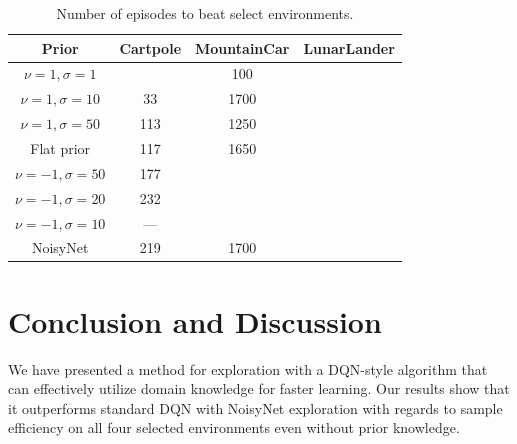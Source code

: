 \documentclass[]{uai2022} %
\begin{document}
\begin{table}
    \centering
    \caption{Number of episodes to beat select environments.}\label{tab:prior_results}
    \begin{tabular}{cccc}
        \toprule
        Prior & Cartpole & MountainCar & LunarLander\\
        \midrule
        \(\nu = 1, \sigma = 1\)   & \tB 14  & 100 &\\
        \(\nu = 1, \sigma = 10\)  &     33  & 1700 &\\
        \(\nu = 1, \sigma = 50\)  &     113 & 1250 &\\
        Flat prior                &     117 & 1650 &\\
        \(\nu = -1, \sigma = 50\) &     177 & &\\
        \(\nu = -1, \sigma = 20\) &     232 & &\\
        \(\nu = -1, \sigma = 10\) &     --- & &\\
        \midrule
        NoisyNet                  &     219 & 1700 &\\
        \bottomrule
    \end{tabular}
\end{table}





\section{Conclusion and Discussion}
We have presented a method for exploration with a DQN-style algorithm that can
effectively utilize domain knowledge for faster learning. Our results show that
it outperforms standard DQN with NoisyNet exploration with regards to sample efficiency
on all four selected environments even without prior knowledge.
\end{document}
